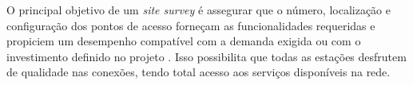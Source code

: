\begin{figure}[H]
	\centering
\end{figure}

O principal objetivo de um \textit{site survey} é assegurar que o número, localização e configuração dos pontos de acesso forneçam as funcionalidades requeridas e propiciem um desempenho compatível com a demanda exigida ou com o investimento definido no projeto \cite{pinheiro2004site}. Isso possibilita que todas as estações desfrutem de qualidade nas conexões, tendo total acesso aos serviços disponíveis na rede.

